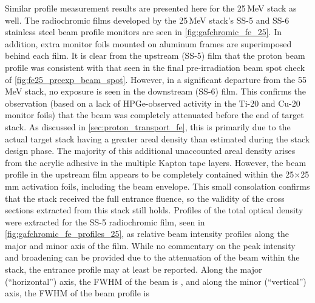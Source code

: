 Similar profile measurement results are presented here for the 25\,MeV stack as well.
The radiochromic films developed by the 25\,MeV stack's SS-5 and SS-6 stainless steel beam profile monitors are seen in \autoref{fig:gafchromic_fe_25}.
In addition, extra  monitor foils mounted on  aluminum frames are superimposed behind each film.
It is clear from the upstream (SS-5) film that the proton beam profile was consistent with that seen in the final pre-irradiation beam spot check of  \autoref{fig:fe25_preexp_beam_spot}.
However, in a significant departure from the 55\,MeV stack, no exposure is seen in the  downstream (SS-6) film.
This confirms the observation (based on a lack of HPGe-observed activity in the Ti-20 and Cu-20 monitor foils) that the beam was completely attenuated before the end of target stack.
As discussed in \autoref{sec:proton_transport_fe}, this is primarily due to the actual target stack having a greater areal density than estimated during the stack design phase.
The majority of this additional unaccounted areal density arises from the acrylic adhesive in the multiple Kapton tape layers.  
However,  the beam profile in the upstream film appears to be completely contained within the 25$\times$25\,mm activation foils, including the beam envelope.
This small consolation confirms that the stack received the full entrance fluence, so the validity of the cross sections extracted from this stack still holds.
Profiles of the total optical density were extracted for  the SS-5 radiochromic film,  seen in \autoref{fig:gafchromic_fe_profiles_25}, as relative beam intensity profiles along the major and minor axis of the film.
While no commentary on the peak intensity and broadening can be provided due to the attenuation of the beam within the stack, the entrance profile may at least be reported.
Along the major (\enquote{horizontal}) axis, the FWHM of the beam is , and along the minor (\enquote{vertical}) axis, the FWHM of the beam profile is 








